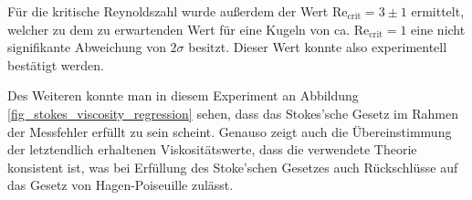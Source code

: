 \documentclass[12pt,a4paper,german]{scrartcl}
\numberwithin{equation}{section}
\begin{document}
  Für die kritische Reynoldszahl wurde außerdem der Wert $\text{Re}_\text{crit} = 3 \pm 1$ ermittelt, welcher zu dem zu erwartenden Wert für eine Kugeln von ca. $\text{Re}_\text{crit} = 1$ eine nicht signifikante Abweichung von $2\sigma$ besitzt. Dieser Wert konnte also experimentell bestätigt werden.

  Des Weiteren konnte man in diesem Experiment an Abbildung \ref{fig_stokes_viscosity_regression} sehen, dass das Stokes'sche Gesetz im Rahmen der Messfehler erfüllt zu sein scheint.
  Genauso zeigt auch die Übereinstimmung der letztendlich erhaltenen Viskositätswerte, dass die verwendete Theorie konsistent ist, was bei Erfüllung des Stoke'schen Gesetzes auch Rückschlüsse auf das Gesetz von Hagen-Poiseuille zulässt.
\end{document}
